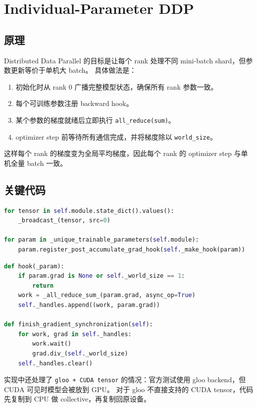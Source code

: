 \documentclass[UTF8,11pt]{ctexart}
\begin{document}
\section{Individual-Parameter DDP}

\subsection{原理}

Distributed Data Parallel 的目标是让每个 rank 处理不同 mini-batch shard，但参数更新等价于单机大 batch。
具体做法是：

\begin{enumerate}
  \item 初始化时从 rank 0 广播完整模型状态，确保所有 rank 参数一致。
  \item 每个可训练参数注册 backward hook。
  \item 某个参数的梯度就绪后立即执行 \texttt{all\_reduce(sum)}。
  \item optimizer step 前等待所有通信完成，并将梯度除以 \texttt{world\_size}。
\end{enumerate}

这样每个 rank 的梯度变为全局平均梯度，因此每个 rank 的 optimizer step 与单机全量 batch 一致。

\subsection{关键代码}

\begin{lstlisting}[language=Python]
for tensor in self.module.state_dict().values():
    _broadcast_(tensor, src=0)

for param in _unique_trainable_parameters(self.module):
    param.register_post_accumulate_grad_hook(self._make_hook(param))
\end{lstlisting}

\begin{lstlisting}[language=Python]
def hook(_param):
    if param.grad is None or self._world_size == 1:
        return
    work = _all_reduce_sum_(param.grad, async_op=True)
    self._handles.append((work, param.grad))

def finish_gradient_synchronization(self):
    for work, grad in self._handles:
        work.wait()
        grad.div_(self._world_size)
    self._handles.clear()
\end{lstlisting}

实现中还处理了 \texttt{gloo + CUDA tensor} 的情况：官方测试使用 gloo backend，但 CUDA 可见时模型会被放到 GPU。
对于 gloo 不直接支持的 CUDA tensor，代码先复制到 CPU 做 collective，再复制回原设备。
\end{document}
